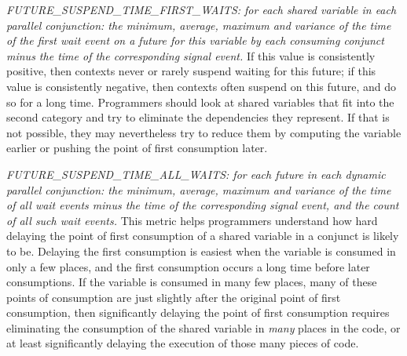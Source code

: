 


\emph{FUTURE\_SUSPEND\_TIME\_FIRST\_WAITS:
for each shared variable in each parallel conjunction:
the minimum, average, maximum and variance of the time
of the first wait event on a future for this variable
by each consuming conjunct
minus the time of the corresponding signal event.}
If this value is consistently positive,
then contexts never or rarely suspend waiting for this future;
if this value is consistently negative,
then contexts often suspend on this future, and do so for a long time.
Programmers should look at shared variables
that fit into the second category
and try to eliminate the dependencies they represent.
If that is not possible, they may nevertheless try to reduce them
by computing the variable earlier
or pushing the point of first consumption later.

\emph{FUTURE\_SUSPEND\_TIME\_ALL\_WAITS:
for each future in each dynamic parallel conjunction:
the minimum, average, maximum and variance of the time
of all wait events minus the time of the corresponding signal event,
and the count of all such wait events.}
This metric helps programmers understand how hard
delaying the point of first consumption of a shared variable in a conjunct
is likely to be.
Delaying the first consumption is easiest
when the variable is consumed in only a few places,
and the first consumption occurs a long time before later consumptions.
If the variable is consumed in many few places,
many of these points of consumption are just slightly after
the original point of first consumption,
then significantly delaying the point of first consumption
requires eliminating the consumption of the shared variable
in \emph{many} places in the code,
or at least significantly delaying the execution
of those many pieces of code.

